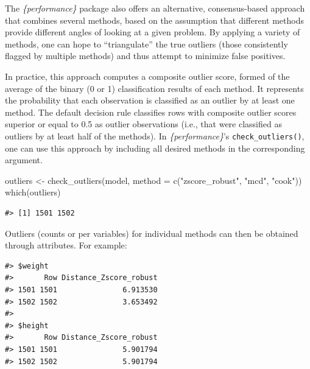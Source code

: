 \documentclass{article}
\newenvironment{Shaded}{\begin{snugshade}}{\end{snugshade}}
\newcommand{\AttributeTok}[1]{\textcolor[rgb]{0.77,0.63,0.00}{#1}}
\newcommand{\FunctionTok}[1]{\textcolor[rgb]{0.00,0.00,0.00}{#1}}
\newcommand{\NormalTok}[1]{#1}
\newcommand{\OtherTok}[1]{\textcolor[rgb]{0.56,0.35,0.01}{#1}}
\newcommand{\SpecialCharTok}[1]{\textcolor[rgb]{0.00,0.00,0.00}{#1}}
\newcommand{\StringTok}[1]{\textcolor[rgb]{0.31,0.60,0.02}{#1}}
\begin{document}
The \emph{\{performance\}} package also offers an alternative,
consensus-based approach that combines several methods, based on the
assumption that different methods provide different angles of looking at
a given problem. By applying a variety of methods, one can hope to
``triangulate'' the true outliers (those consistently flagged by
multiple methods) and thus attempt to minimize false positives.

In practice, this approach computes a composite outlier score, formed of
the average of the binary (0 or 1) classification results of each
method. It represents the probability that each observation is
classified as an outlier by at least one method. The default decision
rule classifies rows with composite outlier scores superior or equal to
0.5 as outlier observations (i.e., that were classified as outliers by
at least half of the methods). In \emph{\{performance\}}'s
\texttt{check\_outliers()}, one can use this approach by including all
desired methods in the corresponding argument.

\begin{Shaded}
\begin{Highlighting}[]
\NormalTok{outliers }\OtherTok{\textless{}{-}} \FunctionTok{check\_outliers}\NormalTok{(model, }\AttributeTok{method =} \FunctionTok{c}\NormalTok{(}\StringTok{"zscore\_robust"}\NormalTok{, }\StringTok{"mcd"}\NormalTok{, }\StringTok{"cook"}\NormalTok{))}
\FunctionTok{which}\NormalTok{(outliers)}
\end{Highlighting}
\end{Shaded}

\begin{verbatim}
#> [1] 1501 1502
\end{verbatim}

Outliers (counts or per variables) for individual methods can then be
obtained through attributes. For example:

\begin{Shaded}
\end{Shaded}

\begin{verbatim}
#> $weight
#>       Row Distance_Zscore_robust
#> 1501 1501               6.913530
#> 1502 1502               3.653492
#> 
#> $height
#>       Row Distance_Zscore_robust
#> 1501 1501               5.901794
#> 1502 1502               5.901794
\end{verbatim}
\end{document}
